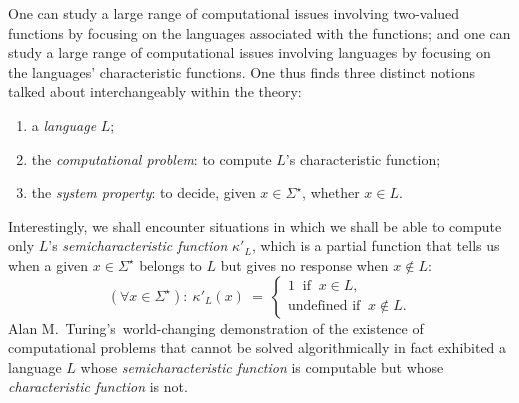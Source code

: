\documentclass{article}
\begin{document}
{One can study a large range of computational issues involving
two-valued functions by focusing on the languages associated with the
functions; and one can study a large range of computational issues
involving languages by focusing on the languages' characteristic
functions.  One thus finds three distinct notions talked about
interchangeably within the theory:
\begin{enumerate}
\item
a {\em language} $L$;
\item
the {\em computational problem}: to compute $L$'s characteristic
function;
\item
the {\em system property}: to decide, given $x \in \Sigma^\star$,
whether $x \in L$.
\end{enumerate}

Interestingly, we shall encounter situations in which we shall be able
to compute only $L$'s {\em semicharacteristic function}
$\kappa'_L$,
which is a partial function that tells us when a given $x \in
\Sigma^\star$ belongs to $L$ but gives no response when $x \notin L$:
\[ (\forall x \in \Sigma^\star): \  \kappa'_L(x) \ = \ \left\{
\begin{array}{l}
1 \ \mbox{ if } \ x \in L, \\
\mbox{undefined if } \ x \not\in L.
\end{array} \right.
\]
Alan M.~Turing's~world-changing demonstration
of the existence of computational problems that cannot be solved
algorithmically \cite{Turing36} in fact exhibited a language $L$ whose
{\em semicharacteristic function} is computable but whose {\em
  characteristic function} is not.

}
\end{document}
